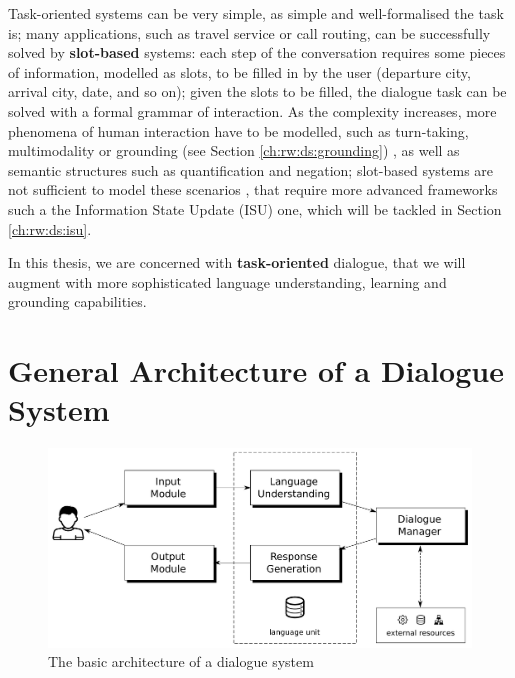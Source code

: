 Task-oriented systems can be very simple, as simple and well-formalised the task is;  many applications, such as travel service or call routing, can be successfully solved by \textbf{slot-based} systems: each step of the conversation requires some pieces of information, modelled as slots, to be filled in by the user (departure city, arrival city, date, and so on); given the slots to be filled, the dialogue task can be solved with a formal grammar of interaction. As the complexity increases, more phenomena of human interaction have to be modelled, such as turn-taking, multimodality or grounding (see Section \ref{ch:rw:ds:grounding})
, as well as semantic structures such as quantification and negation; slot-based systems are not sufficient to model these scenarios \citep{Gabsdil03clarificationin}, that require more advanced frameworks such a the Information State Update (ISU) one, which will be tackled in Section \ref{ch:rw:ds:isu}.

In this thesis, we are concerned with \textbf{task-oriented} dialogue, that we will augment with more sophisticated language understanding, learning and grounding capabilities.


\section{General Architecture of a Dialogue System} \label{ch:introduction:arch}
\begin{figure}
	\centering
	\includegraphics[width=15cm]{Pictures/ds_arch.pdf}
	\caption{The basic architecture of a dialogue system}
	\label{ds_arch}
\end{figure}

